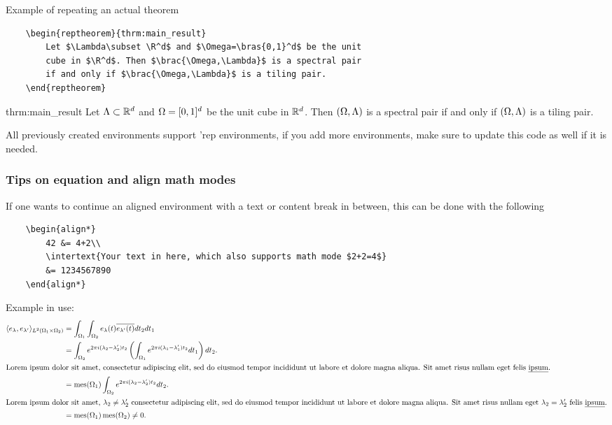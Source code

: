 \documentclass[../thesis.tex]{subfiles}
\begin{document}
Example of repeating an actual theorem
\begin{verbatim}
    \begin{reptheorem}{thrm:main_result}
        Let $\Lambda\subset \R^d$ and $\Omega=\bras{0,1}^d$ be the unit 
        cube in $\R^d$. Then $\brac{\Omega,\Lambda}$ is a spectral pair 
        if and only if $\brac{\Omega,\Lambda}$ is a tiling pair.
    \end{reptheorem}
\end{verbatim}
\begin{reptheorem}{thrm:main_result}
    Let $\Lambda\subset \mathbb{R}^d$ and $\Omega=[0,1]^d$ be the unit cube in $\mathbb{R}^d$. Then $(\Omega,\Lambda)$ is a spectral pair if and only if $(\Omega,\Lambda)$ is a tiling pair.
\end{reptheorem}

All previously created environments support 'rep environments, if you add more environments, make sure to update this code as well if it is needed. 


\subsubsection{Tips on equation and align math modes}

If one wants to continue an aligned environment with a text or content break in between, this can be done with the following
\begin{verbatim}
    \begin{align*}
        42 &= 4+2\\
        \intertext{Your text in here, which also supports math mode $2+2=4$}
        &= 1234567890
    \end{align*}
\end{verbatim}

Example in use:
\begin{align*}
    \langle e_\lambda,e_{\lambda'}\rangle_{L^2(\Omega_1 \times \Omega_2)} 
    &= \int_{\Omega_1} \int_{\Omega_2} e_{\lambda}(t) \overline{e_{\lambda'}(t)} dt_2 dt_1\\
    &= \int_{\Omega_2} e^{2\pi i  (\lambda_2- \lambda_2')t_2} \left(\int_{\Omega_1}  e^{2\pi i (\lambda_1 - \lambda_1')t_2} dt_1\right) dt_2.\\
    \intertext{Lorem ipsum dolor sit amet, consectetur adipiscing elit, sed do eiusmod tempor incididunt ut labore et dolore magna aliqua. Sit amet risus nullam eget felis \emph{ipsum}.}
    &= \operatorname{mes}(\Omega_1) \int_{\Omega_2} e^{2\pi i  (\lambda_2- \lambda_2')t_2} dt_2.\\
    \intertext{Lorem ipsum dolor sit amet, $\lambda_2 \neq \lambda_2'$ consectetur adipiscing elit, sed do eiusmod tempor incididunt ut labore et dolore magna aliqua. Sit amet risus nullam eget $\lambda_2 = \lambda_2'$ felis \emph{ipsum}.}
    &= \operatorname{mes}(\Omega_1)\operatorname{mes}(\Omega_2) \neq 0.
\end{align*}
\end{document}
